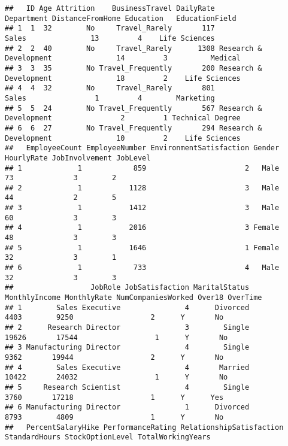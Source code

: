 \documentclass[
]{article}
\newenvironment{Shaded}{\begin{snugshade}}{\end{snugshade}}
\newcommand{\KeywordTok}[1]{\textcolor[rgb]{0.13,0.29,0.53}{\textbf{#1}}}
\newcommand{\NormalTok}[1]{#1}
\begin{document}
\begin{Shaded}
\begin{Highlighting}[]
{{\KeywordTok{head}\NormalTok{(data)}
\end{Highlighting}
\end{Shaded}

\begin{verbatim}
##   ID Age Attrition    BusinessTravel DailyRate             Department DistanceFromHome Education   EducationField
## 1  1  32        No     Travel_Rarely       117                  Sales               13         4    Life Sciences
## 2  2  40        No     Travel_Rarely      1308 Research & Development               14         3          Medical
## 3  3  35        No Travel_Frequently       200 Research & Development               18         2    Life Sciences
## 4  4  32        No     Travel_Rarely       801                  Sales                1         4        Marketing
## 5  5  24        No Travel_Frequently       567 Research & Development                2         1 Technical Degree
## 6  6  27        No Travel_Frequently       294 Research & Development               10         2    Life Sciences
##   EmployeeCount EmployeeNumber EnvironmentSatisfaction Gender HourlyRate JobInvolvement JobLevel
## 1             1            859                       2   Male         73              3        2
## 2             1           1128                       3   Male         44              2        5
## 3             1           1412                       3   Male         60              3        3
## 4             1           2016                       3 Female         48              3        3
## 5             1           1646                       1 Female         32              3        1
## 6             1            733                       4   Male         32              3        3
##                  JobRole JobSatisfaction MaritalStatus MonthlyIncome MonthlyRate NumCompaniesWorked Over18 OverTime
## 1        Sales Executive               4      Divorced          4403        9250                  2      Y       No
## 2      Research Director               3        Single         19626       17544                  1      Y       No
## 3 Manufacturing Director               4        Single          9362       19944                  2      Y       No
## 4        Sales Executive               4       Married         10422       24032                  1      Y       No
## 5     Research Scientist               4        Single          3760       17218                  1      Y      Yes
## 6 Manufacturing Director               1      Divorced          8793        4809                  1      Y       No
##   PercentSalaryHike PerformanceRating RelationshipSatisfaction StandardHours StockOptionLevel TotalWorkingYears

\end{verbatim}
\end{document}
